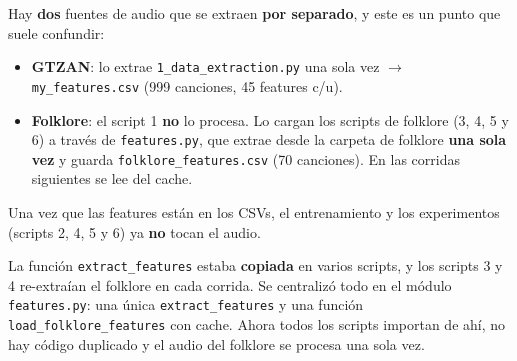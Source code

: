 \documentclass[11pt,a4paper]{article}
\newenvironment{ideabox}[1]{\begin{mdframed}[style=ideastyle,frametitle={#1}]}{\end{mdframed}}
\begin{document}
\begin{center}
\end{center}

Hay \textbf{dos} fuentes de audio que se extraen \textbf{por separado}, y este es
un punto que suele confundir:
\begin{itemize}[leftmargin=0.7cm]
  \item \textbf{GTZAN}: lo extrae \texttt{1\_data\_extraction.py} una sola vez
  $\rightarrow$ \texttt{my\_features.csv} (999 canciones, 45 features c/u).
  \item \textbf{Folklore}: el script 1 \textbf{no} lo procesa. Lo cargan los
  scripts de folklore (3, 4, 5 y 6) a través de \texttt{features.py}, que extrae
  desde la carpeta de folklore \textbf{una sola vez} y guarda
  \texttt{folklore\_\allowbreak features.csv} (70 canciones). En las corridas siguientes se
  lee del cache.
\end{itemize}

Una vez que las features están en los CSVs, el entrenamiento y los experimentos
(scripts 2, 4, 5 y 6) ya \textbf{no} tocan el audio.

\begin{ideabox}{Extracción centralizada (refactor)}
La función \texttt{extract\_features} estaba \textbf{copiada} en varios scripts, y
los scripts 3 y 4 re-extraían el folklore en cada corrida. Se centralizó todo en
el módulo \texttt{features.py}: una única \texttt{extract\_\allowbreak features} y una función
\texttt{load\_\allowbreak folklore\_\allowbreak features} con cache. Ahora todos los scripts importan de
ahí, no hay código duplicado y el audio del folklore se procesa una sola vez.
\end{ideabox}
\end{document}
